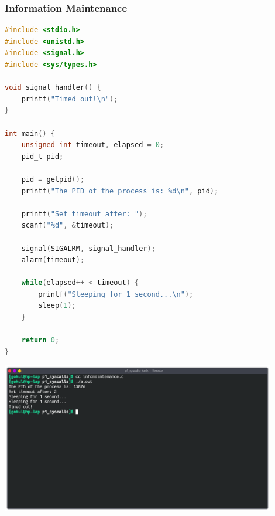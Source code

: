 \subsubsection{Information Maintenance}
\begin{lstlisting}[language=C]
#include <stdio.h>
#include <unistd.h>
#include <signal.h>
#include <sys/types.h>

void signal_handler() {
	printf("Timed out!\n");
}

int main() {
	unsigned int timeout, elapsed = 0;
	pid_t pid;

	pid = getpid();
	printf("The PID of the process is: %d\n", pid);

	printf("Set timeout after: ");
	scanf("%d", &timeout);

	signal(SIGALRM, signal_handler);
	alarm(timeout);

	while(elapsed++ < timeout) {
		printf("Sleeping for 1 second...\n");
		sleep(1);
	}

	return 0;
}		
\end{lstlisting}

\begin{center}
	\includegraphics[width=0.90\textwidth]{img/p2/ss3.png}
\end{center}

